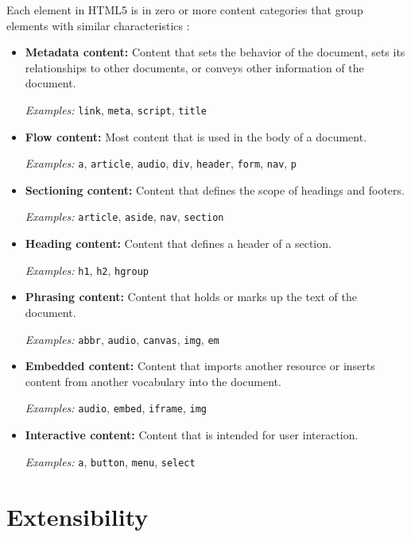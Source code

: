 \noindent Each element in HTML5 is in zero or more content categories
that group elements with similar characteristics \cite{HTML5draft}:

\begin{itemize}
\item \textbf{Metadata content:} Content that sets the behavior of the
  document, sets its relationships to other documents, or conveys
  other information of the document.

  \textit{Examples:} \texttt{link}, \texttt{meta}, \texttt{script},
  \texttt{title}

\item \textbf{Flow content:} Most content that is used in the body of
  a document.

  \textit{Examples:} \texttt{a}, \texttt{article}, \texttt{audio},
  \texttt{div}, \texttt{header}, \texttt{form}, \texttt{nav},
  \texttt{p}

\item \textbf{Sectioning content:} Content that defines the scope of
  headings and footers.

  \textit{Examples:} \texttt{article}, \texttt{aside}, \texttt{nav},
  \texttt{section}

\item \textbf{Heading content:} Content that defines a header of a
  section.

  \textit{Examples:} \texttt{h1}, \texttt{h2}, \texttt{hgroup}

\item \textbf{Phrasing content:} Content that holds or marks up the
  text of the document.

  \textit{Examples:} \texttt{abbr}, \texttt{audio}, \texttt{canvas},
  \texttt{img}, \texttt{em}

\item \textbf{Embedded content:} Content that imports another resource
  or inserts content from another vocabulary into the document.

  \textit{Examples:} \texttt{audio}, \texttt{embed}, \texttt{iframe},
  \texttt{img}

\item \textbf{Interactive content:} Content that is intended for user
  interaction.

  \textit{Examples:} \texttt{a}, \texttt{button}, \texttt{menu},
  \texttt{select}

\end{itemize}

\section{Extensibility}

